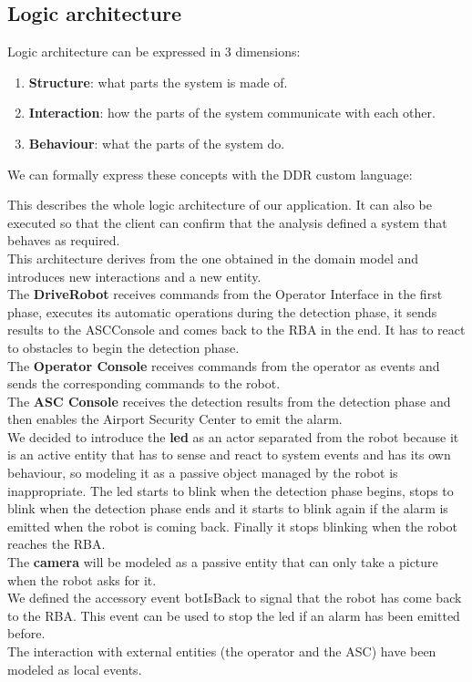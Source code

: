 \documentclass{llncs}
\begin{document}
\subsection{Logic architecture}
Logic architecture can be expressed in 3 dimensions:
\begin{enumerate}
\item \textbf{Structure}: what parts the system is made of.
\item \textbf{Interaction}: how the parts of the system communicate with each other.
\item \textbf{Behaviour}: what the parts of the system do.
\end{enumerate}
We can formally express these concepts with the DDR custom language:

This describes the whole logic architecture of our application. It can also be executed so that the client can confirm that the analysis defined a system that behaves as required.\\
This architecture derives from the one obtained in the domain model and introduces new interactions and a new entity.\\
The \textbf{DriveRobot} receives commands from the Operator Interface in the first phase, executes its automatic operations during the detection phase, it sends results to the ASCConsole and comes back to the RBA in the end. It has to react to obstacles to begin the detection phase.\\
The \textbf{Operator Console} receives commands from the operator as events and sends the corresponding commands to the robot.\\
The \textbf{ASC Console} receives the detection results from the detection phase and then enables the Airport Security Center to emit the alarm.\\
We decided to introduce the \textbf{led} as an actor separated from the robot because it is an active entity that has to sense and react to system events and has its own behaviour, so modeling it as a passive object managed by the robot is inappropriate. The led starts to blink when the detection phase begins, stops to blink when the detection phase ends and it starts to blink again if the alarm is emitted when the robot is coming back. Finally it stops blinking when the robot reaches the RBA.\\
The \textbf{camera} will be modeled as a passive entity that can only take a picture when the robot asks for it.\\
We defined the accessory event botIsBack to signal that the robot has come back to the RBA. This event can be used to stop the led if an alarm has been emitted before.\\
The interaction with external entities (the operator and the ASC) have been modeled as local events.
\newpage
\end{document}
